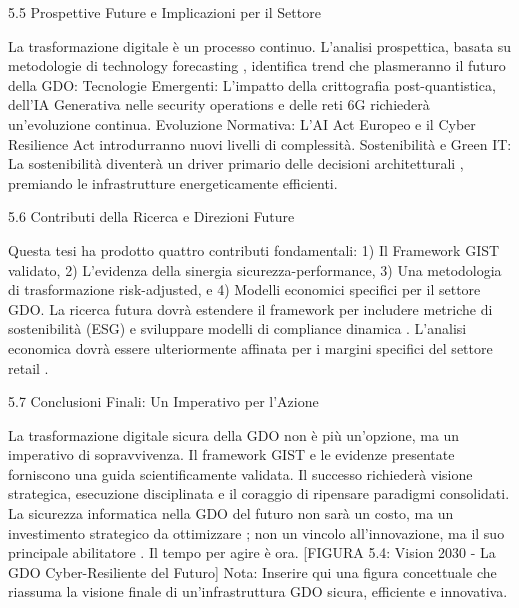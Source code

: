 5.5 Prospettive Future e Implicazioni per il Settore

La trasformazione digitale è un processo continuo. L'analisi prospettica, basata su metodologie di technology forecasting \autocite{linstone2002,martino1993}, identifica trend che plasmeranno il futuro della GDO:
Tecnologie Emergenti: L'impatto della crittografia post-quantistica, dell'IA Generativa nelle security operations e delle reti 6G richiederà un'evoluzione continua.
Evoluzione Normativa: L'AI Act Europeo e il Cyber Resilience Act \autocite{ec2024digital} introdurranno nuovi livelli di complessità.
Sostenibilità e Green IT: La sostenibilità diventerà un driver primario delle decisioni architetturali \autocite{greengrid2024}, premiando le infrastrutture energeticamente efficienti.

5.6 Contributi della Ricerca e Direzioni Future

Questa tesi ha prodotto quattro contributi fondamentali: 1) Il Framework GIST validato, 2) L'evidenza della sinergia sicurezza-performance, 3) Una metodologia di trasformazione risk-adjusted, e 4) Modelli economici specifici per il settore GDO. La ricerca futura dovrà estendere il framework per includere metriche di sostenibilità (ESG) \autocite{eurostat2024} e sviluppare modelli di compliance dinamica \autocite{parmenter2019}. L'analisi economica dovrà essere ulteriormente affinata per i margini specifici del settore retail \autocite{bcg2024,mckinsey2024digital,accenture2024tech}.

5.7 Conclusioni Finali: Un Imperativo per l'Azione

La trasformazione digitale sicura della GDO non è più un'opzione, ma un imperativo di sopravvivenza. Il framework GIST e le evidenze presentate forniscono una guida scientificamente validata. Il successo richiederà visione strategica, esecuzione disciplinata \autocite{mckinsey2023} e il coraggio di ripensare paradigmi consolidati. La sicurezza informatica nella GDO del futuro non sarà un costo, ma un investimento strategico da ottimizzare \autocite{forrester2024cloud}; non un vincolo all'innovazione, ma il suo principale abilitatore \autocite{gartner2024market}. Il tempo per agire è ora.
[FIGURA 5.4: Vision 2030 - La GDO Cyber-Resiliente del Futuro]
Nota: Inserire qui una figura concettuale che riassuma la visione finale di un'infrastruttura GDO sicura, efficiente e innovativa.






































